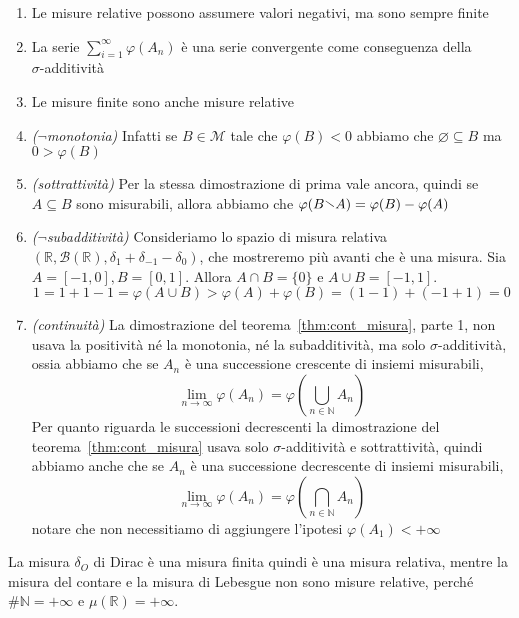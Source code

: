 \begin{enumerate}[label = \arabic*.]
    \item Le misure relative possono assumere valori negativi, ma sono sempre
        finite
    \item La serie \(\sum_{i=1}^{\infty} \varphi(A_{n})\) è una serie
        convergente come conseguenza della \\ \(\sigma\)-additività
    \item Le misure finite sono anche misure relative
    \item \emph{(\(\lnot\)monotonia)} Infatti se \(B \in \mathcal{M}\) tale che
        \(\varphi(B) < 0\) abbiamo che \(\varnothing \subseteq B \) ma \(0 >
        \varphi(B)\) 
    \item \emph{(sottrattività)} Per la stessa dimostrazione di prima vale
        ancora, quindi se \(A \subseteq B \) sono misurabili, allora abbiamo che
        \(\varphi(B \sminus A) = \varphi(B) - \varphi(A)\) 
    \item \emph{(\(\lnot\)subadditività)} Consideriamo lo spazio di misura
        relativa \((\mathbb{R}, \mathcal{B}(\mathbb{R}), \delta_1 + \delta_{-1}
        - \delta_0)\), che mostreremo più avanti che è una misura. Sia \(A =
        [-1, 0], B = [0, 1]\). Allora \(A \cap B = \{0\} \) e \(A \cup B = [-1,
        1]\).
        \[
            1 = 1 + 1 - 1 = \varphi(A \cup B) > \varphi(A) + \varphi(B) = (1 -
            1) + (-1 + 1) = 0
        \]
    \item \emph{(continuità)} La dimostrazione del
        teorema~\ref{thm:cont_misura}, parte 1,
        non usava la positività né la monotonia, né la subadditività, ma solo
        \(\sigma\)-additività, ossia abbiamo che
        se \(A_{n}\) è una successione crescente di insiemi misurabili,
        \[
            \lim_{n \to \infty} \varphi(A_{n}) = \varphi\left( \bigcup_{n \in
            \mathbb{N}} A_{n} \right) 
        \]
        Per quanto riguarda le successioni decrescenti la dimostrazione del
        teorema~\ref{thm:cont_misura} usava solo \(\sigma\)-additività e
        sottrattività, quindi abbiamo anche che se \(A_{n}\) è una successione
        decrescente di insiemi misurabili,
        \[
            \lim_{n \to \infty} \varphi(A_{n}) = \varphi \left( \bigcap_{n \in
            \mathbb{N}} A_{n} \right)
        \] 
        notare che non necessitiamo di aggiungere l'ipotesi \(\varphi(A_{1}) <
        +\infty\) 
\end{enumerate}
\begin{example}
    La misura \(\delta_O\) di Dirac è una misura finita quindi è una misura
    relativa, mentre la misura del contare e la misura di Lebesgue non sono
    misure relative, perché \(\# \mathbb{N} = +\infty\) e \(\mu(\mathbb{R}) =
    +\infty\).
\end{example}
